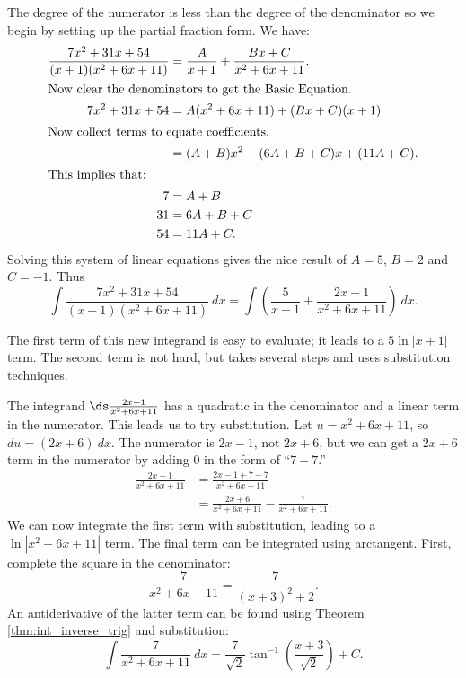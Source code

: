 \begin{solution}
{The degree of the numerator is less than the degree of the denominator so we begin by setting up the partial fraction form. We have:
\begin{align*}
\frac{7x^2+31x+54}{(x+1)(x^2+6x+11)} &= \frac{A}{x+1} + \frac{Bx+C}{x^2+6x+11}. \\
\intertext{Now clear the denominators to get the Basic Equation.}
7x^2+31x+54 &= A(x^2+6x+11) + (Bx+C)(x+1)\\
\intertext{Now collect terms to equate coefficients.}
					&= (A+B)x^2 + (6A+B+C)x + (11A+C).\\
\intertext{This implies that:}
				7&=A+B\\
				31 &= 6A+B+C\\
				54 &= 11A+C.
\end{align*}
Solving this system of linear equations gives the nice result of $A=5$, $B = 2$ and $C=-1$. Thus
$$\int\frac{7x^2+31x+54}{(x+1)(x^2+6x+11)}\ dx = \int\left(\frac{5}{x+1} + \frac{2x-1}{x^2+6x+11}\right)\ dx.$$

The first term of this new integrand is easy to evaluate; it leads to a $5\ln|x+1|$ term. The second term is not hard, but takes several steps and uses substitution techniques.

The integrand $\ds \frac{2x-1}{x^2+6x+11}$ has a quadratic in the denominator and a linear term in the numerator. This leads us to try substitution. Let $u = x^2+6x+11$, so $du = (2x+6)\ dx$. The numerator is $2x-1$, not $2x+6$, but we can get a $2x+6$ term in the numerator by adding $ 0 $ in the form of ``$7-7$.''
\begin{align*}
\frac{2x-1}{x^2+6x+11} &= \frac{2x-1+7-7}{x^2+6x+11} \\
					&= \frac{2x+6}{x^2+6x+11} - \frac{7}{x^2+6x+11}.
\end{align*}
We can now integrate the first term with substitution, leading to a $\ln|x^2+6x+11|$ term. The final term can be integrated using arctangent. First, complete the square in the denominator:
$$\frac{7}{x^2+6x+11} = \frac{7}{(x+3)^2+2}.$$
An antiderivative of the latter term can be found using Theorem \ref{thm:int_inverse_trig} and substitution:
$$\int \frac{7}{x^2+6x+11}\ dx = \frac{7}{\sqrt{2}}\tan^{-1}\left(\frac{x+3}{\sqrt{2}}\right)+C.$$

}
\end{solution}
